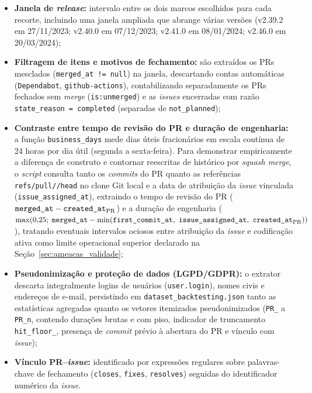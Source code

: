 \documentclass[12pt,openany,oneside,a4paper,english,brazilian,sumario=tradicional]{abntex2}
\begin{document}
\begin{itemize}
  \item \textbf{Janela de \textit{release}:} intervalo entre os dois marcos escolhidos para cada recorte, incluindo uma janela ampliada que abrange várias versões (v2.39.2 em 27/11/2023; v2.40.0 em 07/12/2023; v2.41.0 em 08/01/2024; v2.46.0 em 20/03/2024);
  \item \textbf{Filtragem de itens e motivos de fechamento:} são extraídos os PRs mesclados (\texttt{merged\_\allowbreak at != null}) na janela, descartando contas automáticas (\texttt{Dependabot}, \texttt{github-actions}), contabilizando separadamente os PRs fechados sem \textit{merge} (\texttt{is:unmerged}) e as \textit{issues} encerradas com razão \texttt{state\_\allowbreak reason = completed} (separadas de \texttt{not\_\allowbreak planned});
  \item \textbf{Contraste entre tempo de revisão do PR e duração de engenharia:} a função \texttt{business\_\allowbreak days} mede dias úteis fracionários em escala contínua de 24 horas por dia útil (segunda a sexta-feira). Para demonstrar empiricamente a diferença de construto e contornar reescritas de histórico por \textit{squash merge}, o \textit{script} consulta tanto os \textit{commits} do PR quanto as referências \texttt{refs/\allowbreak pull/\allowbreak */\allowbreak head} no clone Git local e a data de atribuição da \textit{issue} vinculada (\texttt{issue\_\allowbreak assigned\_\allowbreak at}), extraindo o tempo de revisão do PR ($\texttt{merged\_\allowbreak at} - \texttt{created\_\allowbreak at}_{\mathrm{PR}}$) e a duração de engenharia ($\max(0{,}25;\; \texttt{merged\_\allowbreak at} - \allowbreak \min(\texttt{first\_\allowbreak commit\_\allowbreak at},\allowbreak\ \texttt{issue\_\allowbreak assigned\_\allowbreak at},\allowbreak\ \texttt{created\_\allowbreak at}_{\mathrm{PR}}))$), tratando eventuais intervalos ociosos entre atribuição da \textit{issue} e codificação ativa como limite operacional superior declarado na Seção~\ref{sec:ameacas_validade};
  \item \textbf{Pseudonimização e proteção de dados (LGPD/GDPR):} o extrator descarta integralmente logins de usuários (\texttt{user.login}), nomes civis e endereços de e-mail, persistindo em \texttt{dataset\_\allowbreak backtesting.json} tanto as estatísticas agregadas quanto os vetores itemizados pseudonimizados (\texttt{PR\_} a \texttt{PR\_\allowbreak n}, contendo durações brutas e com piso, indicador de truncamento \texttt{hit\_\allowbreak floor\_}, presença de \textit{commit} prévio à abertura do PR e vínculo com \textit{issue});
  \item \textbf{Vínculo PR--\textit{issue}:} identificado por expressões regulares sobre palavras-chave de fechamento (\texttt{closes}, \texttt{fixes}, \texttt{resolves}) seguidas do identificador numérico da \textit{issue}.
\end{itemize}
\end{document}
